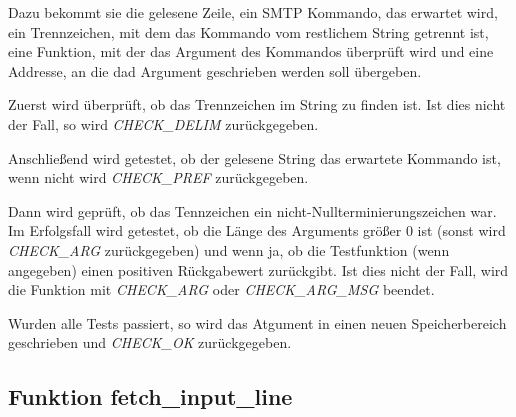 \documentclass[pdftex,final,a4paper,10pt,notitlepage,halfparskip]{scrreprt}
\begin{document}
Dazu bekommt sie die gelesene Zeile, ein SMTP Kommando, das erwartet wird, ein Trennzeichen, mit dem das Kommando vom restlichem String getrennt ist, eine Funktion, mit der das Argument des Kommandos überprüft wird und eine Addresse, an die dad Argument geschrieben werden soll übergeben.

Zuerst wird überprüft, ob das Trennzeichen im String zu finden ist. Ist dies nicht der Fall, so wird \textit{CHECK\_DELIM} zurückgegeben.

Anschließend wird getestet, ob der gelesene String das erwartete Kommando ist, wenn nicht wird \textit{CHECK\_PREF} zurückgegeben.

Dann wird geprüft, ob das Tennzeichen ein nicht-Nullterminierungszeichen war. Im Erfolgsfall wird getestet, ob die Länge des Arguments größer 0 ist (sonst wird \textit{CHECK\_ARG} zurückgegeben) und wenn ja, ob die Testfunktion (wenn angegeben) einen positiven Rückgabewert zurückgibt. Ist dies nicht der Fall, wird die Funktion mit \textit{CHECK\_ARG} oder \textit{CHECK\_ARG\_MSG} beendet.

Wurden alle Tests passiert, so wird das Atgument in einen neuen Speicherbereich geschrieben und \textit{CHECK\_OK} zurückgegeben.

\subsection{Funktion fetch\_input\_line}











\end{document}
